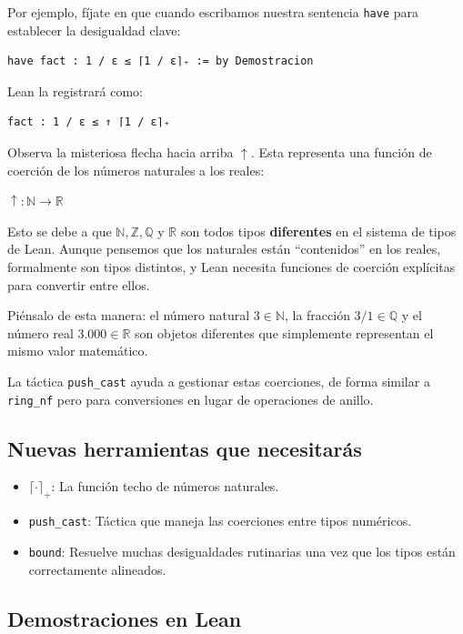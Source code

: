 Por ejemplo, fíjate en que cuando escribamos nuestra sentencia \texttt{have} para establecer la desigualdad clave:
\begin{verbatim}
have fact : 1 / ε ≤ ⌈1 / ε⌉₊ := by Demostracion
\end{verbatim}
Lean la registrará como:
\begin{verbatim}
fact : 1 / ε ≤ ↑ ⌈1 / ε⌉₊
\end{verbatim}
Observa la misteriosa flecha hacia arriba $\uparrow$. Esta representa una función de coerción de los números naturales a los reales:
\begin{center}
    $\uparrow : \mathbb{N} \to \mathbb{R}$
\end{center}
Esto se debe a que $\mathbb{N}, \mathbb{Z}, \mathbb{Q}$ y $\mathbb{R}$ son todos tipos \textbf{diferentes} en el sistema de tipos de Lean. Aunque pensemos que los naturales están ``contenidos'' en los reales, formalmente son tipos distintos, y Lean necesita funciones de coerción explícitas para convertir entre ellos.

Piénsalo de esta manera: el número natural $3 \in \mathbb{N}$, la fracción $3/1 \in \mathbb{Q}$ y el número real $3.000 \in \mathbb{R}$ son objetos diferentes que simplemente representan el mismo valor matemático.

La táctica \texttt{push\_cast} ayuda a gestionar estas coerciones, de forma similar a \texttt{ring\_nf} pero para conversiones en lugar de operaciones de anillo.

\subsection{Nuevas herramientas que necesitarás}

\begin{itemize}
    \item $\lceil \cdot \rceil_+$: La función techo de números naturales.
    \item \texttt{push\_cast}: Táctica que maneja las coerciones entre tipos numéricos.
    \item \texttt{bound}: Resuelve muchas desigualdades rutinarias una vez que los tipos están correctamente alineados.
\end{itemize}

\subsection{Demostraciones en Lean}

